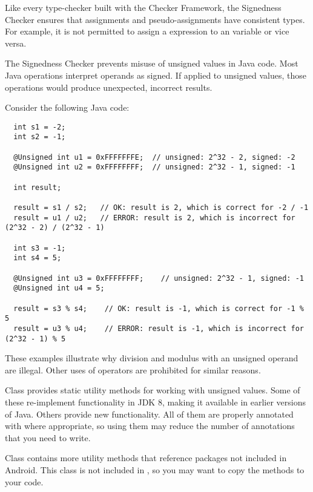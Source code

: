 Like every type-checker built with the Checker Framework, the Signedness
Checker ensures that assignments and pseudo-assignments have consistent types.
For example, it is not permitted to assign a  expression to an
 variable or vice versa.



The Signedness Checker prevents misuse of unsigned values in Java code.
Most Java operations interpret operands as signed.  If applied to unsigned
values, those operations would produce unexpected, incorrect results.

Consider the following Java code:

\begin{Verbatim}
  int s1 = -2;
  int s2 = -1;

  @Unsigned int u1 = 0xFFFFFFFE;  // unsigned: 2^32 - 2, signed: -2
  @Unsigned int u2 = 0xFFFFFFFF;  // unsigned: 2^32 - 1, signed: -1

  int result;

  result = s1 / s2;   // OK: result is 2, which is correct for -2 / -1
  result = u1 / u2;   // ERROR: result is 2, which is incorrect for (2^32 - 2) / (2^32 - 1)

  int s3 = -1;
  int s4 = 5;

  @Unsigned int u3 = 0xFFFFFFFF;    // unsigned: 2^32 - 1, signed: -1
  @Unsigned int u4 = 5;

  result = s3 % s4;    // OK: result is -1, which is correct for -1 % 5
  result = u3 % u4;    // ERROR: result is -1, which is incorrect for (2^32 - 1) % 5
\end{Verbatim}

These examples illustrate why division and modulus with an unsigned operand
are illegal.  Other uses of operators are prohibited for similar reasons.



Class  provides static
utility methods for working with unsigned values.  Some of these
re-implement functionality in JDK 8, making it available in earlier
versions of Java.  Others provide new functionality.  All of them are
properly annotated with 
where appropriate, so using them may reduce the number of annotations that
you need to write.

Class  contains more utility
methods that reference packages not included in Android.  This class is not
included in , so you may want to copy the methods to your code.
